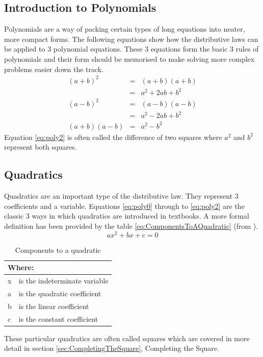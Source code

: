\subsection{Introduction to Polynomials}
\label{sec:IntroductionToPolynomials}
Polynomials are a way of packing certain types of long equations into neater,
more compact forms. The following equations show how the distributive laws can
be applied to 3 polynomial equations. These 3 equations form the basic 3 rules
of polynomials and their form should be memorised to make solving more complex
problems easier down the track.
\begin{align}
  {(a+b)}^{2} & = & (a+b)(a+b) \nonumber \\
              & = & {a}^{2} + 2ab + {b}^{2} \label{eq:poly0} \\
  {(a-b)}^{2} & = & (a-b)(a-b) \nonumber \\
              & = & {a}^{2} - 2ab + {b}^{2} \label{eq:poly1} \\
  (a+b)(a-b)  & = & {a}^{2} - {b}^{2} \label{eq:poly2}
\end{align}
Equation \ref{eq:poly2} is often called the difference of two squares where
${a}^{2}$ and ${b}^{2}$ represent both squares.
\subsection{Quadratics} \label{sec:Quadratics}
Quadratics are an important type of the distributive law. They represent 3
coefficients and a variable. Equations \ref{eq:poly0} through to \ref{eq:poly2}
are the classic 3 ways in which quadratics are introduced in textbooks. A more
formal definition has been provided by the table
\ref{eq:ComponentsToAQuadratic} (from \cite{MD51J}).
\begin{equation}
  a{x}^{2} + bx + c = 0
  \label{eq:ComponentsToAQuadratic}
\end{equation}
\begin{table}[!htb]
\begin{tabularx}{\linewidth}{| l X |}
\hline
\multicolumn{2}{|l|}{Where:} \\
\hline \hline
x & is the indeterminate variable \\
a & is the quadratic coefficient \\
b & is the linear coefficient \\
c & is the constant coefficient \\
\hline
\end{tabularx}
\caption{Components to a quadratic}
\end{table}
These particular quadratics are often called squares which are covered in more
detail in section \ref{sec:CompletingTheSquare}, Completing the Square.
\newpage
